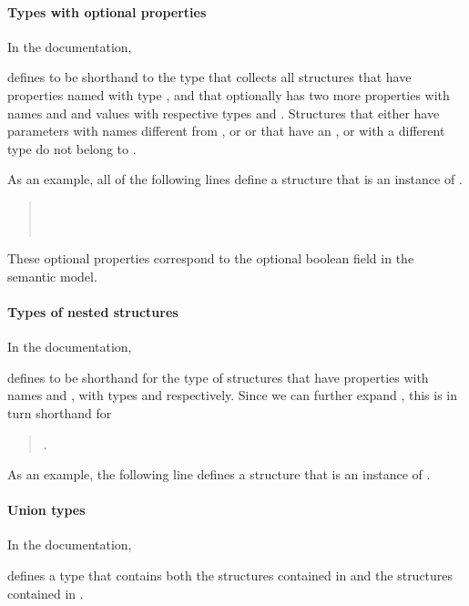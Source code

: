 \paragraph{Types with optional properties}
In the documentation,
\begin{quote}
\end{quote}
defines  to be shorthand to the type that collects all structures that
have properties named  with type , and that optionally has two
more properties with names  and  and values with respective types
 and . Structures that either have parameters
with names different from ,  or  or that have an ,
 or  with a different type do not belong to .

As an example, all of the following lines define a structure that is an
instance of .
\begin{quote}
  \\
  \\
\end{quote}

These optional properties correspond to the optional boolean field in the
semantic model.

\paragraph{Types of nested structures}
In the documentation,
\begin{quote}
\end{quote}
defines  to be shorthand for the type of structures that have properties
with names  and , with types  and 
respectively. Since we can further expand , this is in turn shorthand for
\begin{quote}
  .
\end{quote}

As an example, the following line defines a structure that is an instance of
.
\begin{quote}
\end{quote}

\paragraph{Union types}
In the documentation,
\begin{quote}
\end{quote}
defines a type that contains both the structures contained in  and the
structures contained in .

